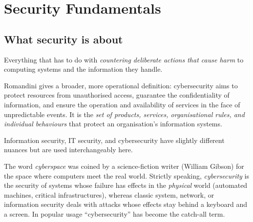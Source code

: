 \section{Security Fundamentals}
\label{sec:security-basics}

\subsection{What security is about}

\begin{definition}
Everything that has to do with \emph{countering deliberate actions that cause harm} to computing systems and the information they handle.
\end{definition}

Romandini gives a broader, more operational definition: cybersecurity aims to protect resources from unauthorised access, guarantee the confidentiality of information, and ensure the operation and availability of services in the face of unpredictable events. It is the \emph{set of products, services, organisational rules, and individual behaviours} that protect an organisation's information systems.

Information security, IT security, and cybersecurity have slightly different nuances but are used interchangeably here.

\begin{remark}[Cyber-]
The word \emph{cyberspace} was coined by a science-fiction writer (William Gibson) for the space where computers meet the real world. Strictly speaking, \emph{cybersecurity} is the security of systems whose failure has effects in the \emph{physical} world (automated machines, critical infrastructures), whereas classic system, network, or information security deals with attacks whose effects stay behind a keyboard and a screen. In popular usage \enquote{cybersecurity} has become the catch-all term.
\end{remark}

